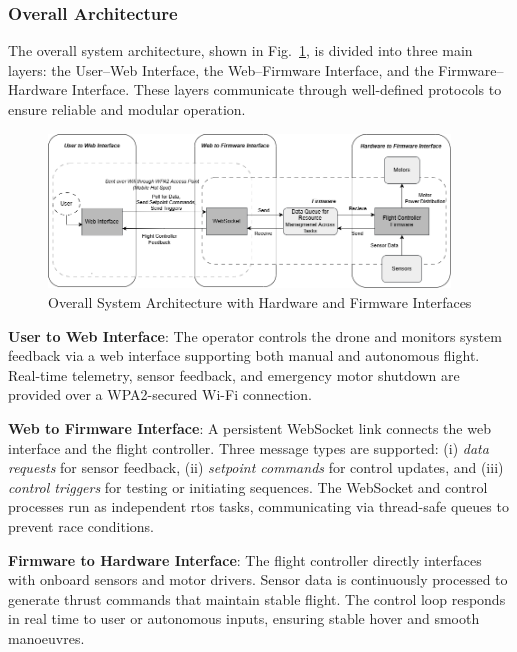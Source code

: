 
\subsubsection{Overall Architecture}

The overall system architecture, shown in Fig.~\ref{fig:block-overall}, is divided into three main layers: the User–Web Interface, the Web–Firmware Interface, and the Firmware–Hardware Interface. These layers communicate through well-defined protocols to ensure reliable and modular operation.

\begin{figure}[H]
    \centering
    \captionsetup{justification=centering, margin=1cm}
    \includegraphics[width=0.95\textwidth]{img/block-overall-gray.PNG}
    \caption{Overall System Architecture with Hardware and Firmware Interfaces}
    \label{fig:block-overall}
\end{figure}

\textbf{User to Web Interface}: The operator controls the drone and monitors system feedback via a web interface supporting both manual and autonomous flight. Real-time telemetry, sensor feedback, and emergency motor shutdown are provided over a WPA2-secured Wi-Fi connection.

\textbf{Web to Firmware Interface}: A persistent WebSocket link connects the web interface and the flight controller. Three message types are supported: (i) \textit{data requests} for sensor feedback, (ii) \textit{setpoint commands} for control updates, and (iii) \textit{control triggers} for testing or initiating sequences. The WebSocket and control processes run as independent \gls{rtos} tasks, communicating via thread-safe queues to prevent race conditions.

\textbf{Firmware to Hardware Interface}: The flight controller directly interfaces with onboard sensors and motor drivers. Sensor data is continuously processed to generate thrust commands that maintain stable flight. The control loop responds in real time to user or autonomous inputs, ensuring stable hover and smooth manoeuvres.

